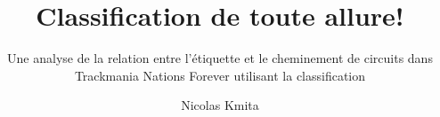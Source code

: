 \documentclass[
  oneside,
  open=any]{scrreprt}
\title{Classification de toute allure!}
\subtitle{Une analyse de la relation entre l'étiquette et le cheminement
de circuits dans Trackmania Nations Forever utilisant la classification}
\author{Nicolas Kmita}
\date{}
\begin{document}


\begin{titlepage}


\newcommand{\titlepagepagealign}{
\ifthenelse{\equal{center}{right}}{\raggedleft}{}
\ifthenelse{\equal{center}{center}}{\centering}{}
\ifthenelse{\equal{center}{left}}{\raggedright}{}
}


\newcommand{\titleandsubtitle}{
{\fontsize{30}{36.0}\selectfont
{\uppercase{\nohyphens{Classification de toute allure!}}}\par
}%

\vspace{\betweentitlesubtitle}
{
{\Large{\textit{\nohyphens{Une analyse de la relation entre l'étiquette
et le cheminement de circuits dans Trackmania Nations Forever utilisant
la classification}}}}\par
}}
\newcommand{\titlepagetitleblock}{
\rule{\textwidth}{0.4pt} %
\vspace{0.025\textheight} %

\titleandsubtitle

\vspace{0.025\textheight} 
\rule{0.3\textwidth}{0.4pt} %
}
\newcommand{\authorstyle}[1]{{\Large{#1}}}

\newcommand{\affiliationstyle}[1]{{\large{#1}}}

\newcommand{\titlepageauthorblock}{
{\authorstyle{\nohyphens{Nicolas Kmita}\\}}
}

\newcommand{\titlepageaffiliationblock}{
\hangindent=1em
\hangafter=1
{\affiliationstyle{
{1}.~École secondaire Franco-Cité


\vspace{1\baselineskip} 
}}
}
\newcommand{\headerstyled}{%
{}
}
\newcommand{\footerstyled}{%
{\large{\textsc{M. Chabot\\
MDM4U\\
25 octobre 2024\\}}}
}
\newcommand{\datestyled}{%
{}
}


\newcommand{\titlepageheaderblock}{\headerstyled}

\newcommand{\titlepagefooterblock}{
\footerstyled
}

\newcommand{\titlepagedateblock}{
\datestyled
}


\end{titlepage}
\end{document}
